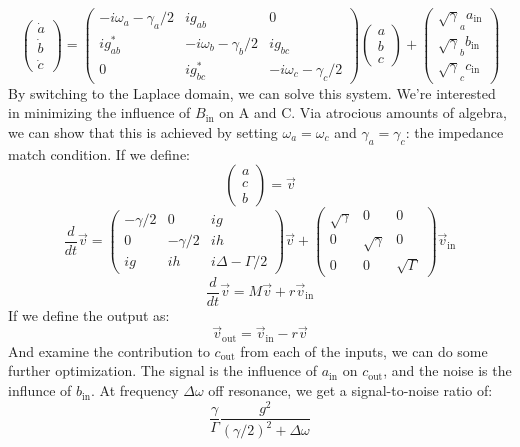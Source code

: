 \documentclass[final]{article}
\begin{document}
\[\begin{pmatrix}\dot a\\\dot b\\\dot c\end{pmatrix}=\begin{pmatrix}-i\omega_a-\gamma_a/2 &ig_{ab} & 0\\ig^*_{ab}&-i\omega_b-\gamma_b/2 & ig_{bc}\\
0& ig^*_{bc}&-i\omega_c-\gamma_c/2\end{pmatrix}\begin{pmatrix}a\\b\\c\end{pmatrix}+
\begin{pmatrix} \sqrt{\gamma}_a a_{\text{in}}\\\sqrt{\gamma}_b b_{\text{in}}\\\sqrt{\gamma}_c c_{\text{in}}\end{pmatrix}\]
By switching to the Laplace domain, we can solve this system. We're interested in minimizing the influence of \(B_{\text{in}}\) on A and C. Via atrocious amounts of algebra, we can show that this is achieved by setting \(\omega_a=\omega_c\) and \(\gamma_a=\gamma_c\): the impedance match condition. If we define:
\[\begin{pmatrix}a\\c\\b\end{pmatrix}=\vec v\]
\[\frac{d}{dt} \vec v=\begin{pmatrix} -\gamma/2 & 0 & ig\\0 & -\gamma/2 & ih\\ig& ih & i\Delta-\Gamma/2\end{pmatrix}\vec v+
\begin{pmatrix} \sqrt{\gamma}&0&0\\0&\sqrt{\gamma}&0\\0&0&\sqrt{\Gamma}\end{pmatrix}\vec v_{\text{in}}\]
\[\frac{d}{dt} \vec v=M\vec v+r\vec v_{\text{in}}\]
If we define the output as:
\[\vec v_{\text{out}}=\vec v_{\text{in}}-r \vec v\]
And examine the contribution to \(c_{\text{out}}\) from each of the inputs, we can do some further optimization. The signal is the influence of \(a_{\text{in}}\) on \(c_{\text{out}}\), and the noise is the influnce of \(b_{\text{in}}\). At frequency \(\Delta \omega\) off resonance, we get a signal-to-noise ratio of:
\[\frac{\gamma}{\Gamma}\frac{g^2}{(\gamma/2)^2+\Delta \omega}\]
\end{document}
